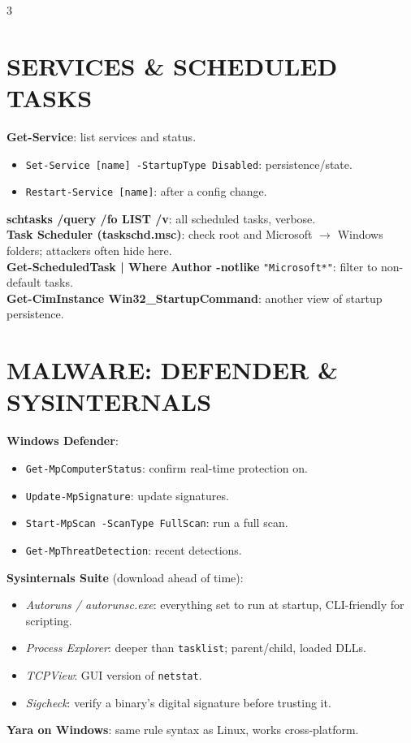\documentclass[7pt,landscape]{article}
\begin{document}
\begin{multicols*}{3}
\section{SERVICES \& SCHEDULED TASKS}
\textbf{Get-Service}: list services and status.
\begin{itemize}
    \item \texttt{Set-Service [name] -StartupType Disabled}: persistence/state.
    \item \texttt{Restart-Service [name]}: after a config change.
\end{itemize}
\textbf{schtasks /query /fo LIST /v}: all scheduled tasks, verbose. \\
\textbf{Task Scheduler (taskschd.msc)}: check root and Microsoft $\rightarrow$ Windows folders; attackers often hide here. \\
\textbf{Get-ScheduledTask | Where Author -notlike} \newline \texttt{"Microsoft*"}: filter to non-default tasks. \\
\textbf{Get-CimInstance Win32\_StartupCommand}: another view of startup persistence.

\section{MALWARE: DEFENDER \& SYSINTERNALS}
\textbf{Windows Defender}:
\begin{itemize}
    \item \texttt{Get-MpComputerStatus}: confirm real-time protection on.
    \item \texttt{Update-MpSignature}: update signatures.
    \item \texttt{Start-MpScan -ScanType FullScan}: run a full scan.
    \item \texttt{Get-MpThreatDetection}: recent detections.
\end{itemize}
\textbf{Sysinternals Suite} (download ahead of time):
\begin{itemize}
    \item \textit{Autoruns / autorunsc.exe}: everything set to run at startup, CLI-friendly for scripting.
    \item \textit{Process Explorer}: deeper than \texttt{tasklist}; parent/child, loaded DLLs.
    \item \textit{TCPView}: GUI version of \texttt{netstat}.
    \item \textit{Sigcheck}: verify a binary's digital signature before trusting it.
\end{itemize}
\textbf{Yara on \textcolor{winc}{Windows}}: same rule syntax as \textcolor{linuxc}{Linux}, works cross-platform.


\end{multicols*}
\end{document}
